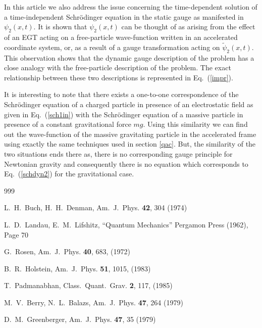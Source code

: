 \documentclass[12pt]{article}
\begin{document}
In this article we also address the issue concerning the time-dependent
solution of a time-independent Schr\"{o}dinger equation in the static gauge as
manifested in $\psi_2(x,t)$. It is shown that $\psi_2(x,t)$ can be thought of
as arising from the effect of an EGT acting on a free-particle wave-function
written in an accelerated coordinate system, or, as a result of a gauge
transformation acting on ${\tilde\psi}_2(x,t)$. This observation shows that the
dynamic gauge description of the problem has a close analogy with the
free-particle description of the problem. The exact relationship between these
two descriptions is represented in Eq.~(\ref{impr}).

It is interesting to note that there exists a one-to-one correspondence of the
Schr\"{o}dinger equation of a charged particle in presence of an electrostatic
field as given in Eq.~(\ref{sch1in}) with the Schr\"{o}dinger equation of a
massive particle in presence of a constant gravitational force $mg$. Using
this similarity we can find out the wave-function of the massive gravitating
particle in the accelerated frame using exactly the same techniques used in
section \ref{qac}. But, the similarity of the two situations ends there as,
there is no corresponding gauge principle for Newtonian gravity and
consequently there is no equation which corresponds to Eq.~(\ref{schdyn2}) for
the gravitational case.
\begin{thebibliography}{999}

 L.~H.~Buch, H.~H.~Denman, Am.~J.~Phys. {\bf 42},
304 (1974)

 L.~D.~Landau, E.~M.~Lifshitz, ``Quantum Mechanics''
Pergamon Press (1962), Page 70


 G.~Rosen, Am.~J.~Phys. {\bf 40}, 683, (1972)

 B.~R.~Holstein, Am.~J.~Phys. {\bf 51}, 1015,
(1983) 

 T.~Padmanabhan, Class.~Quant.~Grav. {\bf 2}, 117,
(1985)  

 M.~V.~Berry, N.~L.~Balazs, Am.~J.~Phys. {\bf 47},
264 (1979) 

 D.~M.~Greenberger, Am.~J.~Phys. {\bf 47},
35 (1979)

\end{thebibliography}
\end{document}
